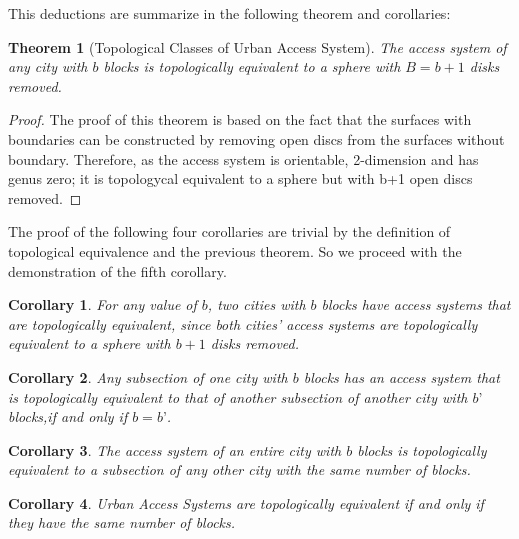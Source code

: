 \documentclass[10pt]{article}
\newtheorem{theorem}{Theorem}
\newtheorem{corollary}{Corollary}[theorem]
\begin{document}
This deductions are summarize in the following theorem and corollaries:\\
\begin{theorem}[Topological Classes of Urban Access System]
The access system of any city with $b$ blocks is topologically equivalent to a sphere with $B=b+1$ disks removed.
\end{theorem}
\begin{proof}
The proof of this theorem is based on the fact that the surfaces with boundaries can be constructed by removing open discs from the surfaces without boundary. Therefore, as the access system is orientable, 2-dimension and has genus zero; it is topologycal equivalent to a sphere but with b+1 open discs removed. 
\end{proof}

The proof of the following four corollaries are trivial by the definition of topological equivalence and the previous theorem. So we proceed with the demonstration of the fifth corollary.

\begin{corollary}
    For any value of $b$, two cities with $b$ blocks have access systems that are topologically equivalent, since both cities’ access systems are topologically equivalent to a sphere with $b+1$ disks removed.
\end{corollary}

\begin{corollary}
    Any subsection of one city with $b$ blocks has an access system that is topologically equivalent to that of another subsection of another city with $b’$ blocks,if and only if $b=b’$.
\end{corollary}

\begin{corollary}
    The access system of an entire city with $b$ blocks is topologically equivalent to a subsection of any other city with the same number of blocks.
\end{corollary}

\begin{corollary}
    Urban Access Systems are topologically equivalent if and only if they have the same number of blocks. 
\end{corollary}
\end{document}
